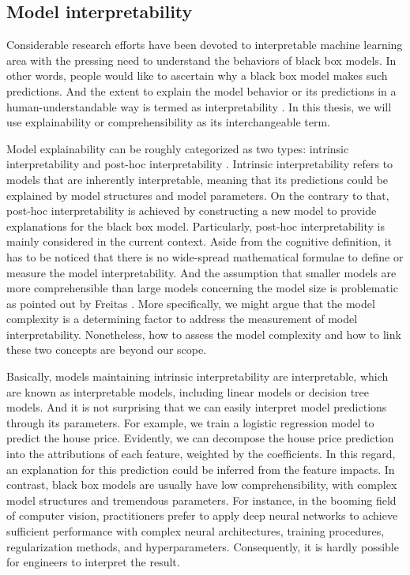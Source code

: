 \subsection{Model interpretability}
Considerable research efforts have been devoted to interpretable machine learning area with the pressing need to understand the behaviors of black box models. In other words, people would like to ascertain why a black box model makes such predictions. And the extent to explain the model behavior or its predictions in a human-understandable way is termed as interpretability \cite{kim2016examples}. In this thesis, we will use explainability or comprehensibility as its interchangeable term. 

Model explainability can be roughly categorized as two types: intrinsic interpretability and post-hoc interpretability \cite{molnar2019}. Intrinsic interpretability refers to models that are inherently interpretable, meaning that its predictions could be explained by model structures and model parameters. On the contrary to that, post-hoc interpretability is achieved by constructing a new model to provide explanations for the black box model. Particularly, post-hoc interpretability is mainly considered in the current context. Aside from the cognitive definition, it has to be noticed that there is no wide-spread mathematical formulae to define or measure the model interpretability. And the assumption that smaller models are more comprehensible than large models concerning the model size is problematic as pointed out by Freitas \cite{freitas2014comprehensible}. More specifically, we might argue that the model complexity is a determining factor to address the measurement of model interpretability. Nonetheless, how to assess the model complexity and how to link these two concepts are beyond our scope. 

Basically, models maintaining intrinsic interpretability are interpretable, which are known as interpretable models, including linear models or decision tree models. And it is not surprising that we can easily interpret model predictions through its parameters. For example, we train a logistic regression model to predict the house price. Evidently, we can decompose the house price prediction into the attributions of each feature, weighted by the coefficients. In this regard, an explanation for this prediction could be inferred from the feature impacts. In contrast, black box models are usually have low comprehensibility, with complex model structures and tremendous parameters. For instance, in the booming field of computer vision, practitioners prefer to apply deep neural networks to achieve sufficient performance with complex neural architectures, training procedures, regularization methods, and hyperparameters. Consequently, it is hardly possible for engineers to interpret the result.

